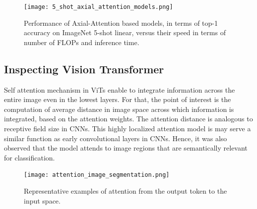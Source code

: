 \documentclass[conference]{IEEEtran}
\begin{document}
\begin{figure}[htbp]
\centerline{\texttt{[image: 5\_shot\_axial\_attention\_models.png]}}
\caption{Performance of Axial-Attention based models, in terms of top-1 accuracy on ImageNet 5-shot linear, versus their speed in terms of number of FLOPs and inference time.}

\end{figure}


\subsection{Inspecting Vision Transformer}

Self attention mechanism in ViTs enable to integrate information across the entire image even in the lowest layers. For that, the point of interest is the computation of average distance in image space across which information is integrated, based on the attention weights. The attention distance is analogous to receptive field size in CNNs. This highly localized attention model is may serve a similar function as early convolutional layers in CNNs. Hence, it was also observed that the model attends to image regions that are semantically relevant for classification.


\begin{figure}[htbp]
\centerline{\texttt{[image: attention\_image\_segmentation.png]}}
\caption{Representative examples of attention from the output token to the input space.}

\end{figure}
\end{document}
